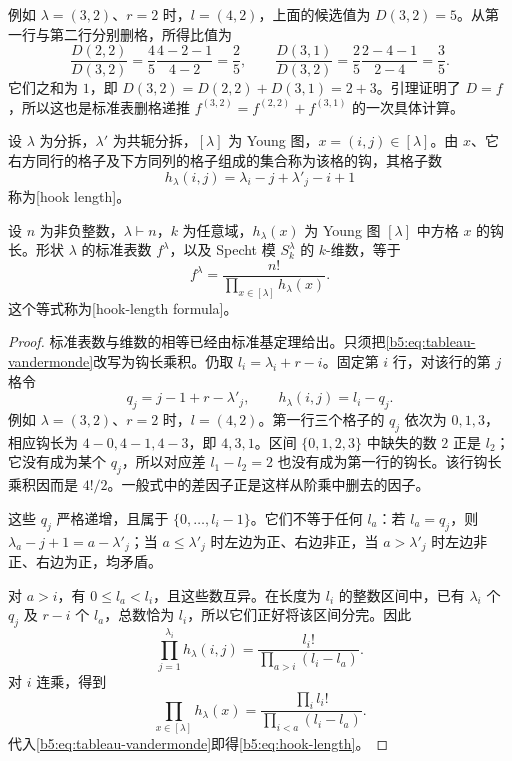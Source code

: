 例如 \(\lambda=(3,2)\)、\(r=2\) 时，\(l=(4,2)\)，上面的候选值为 \(D(3,2)=5\)。从第一行与第二行分别删格，所得比值为
\[
	\frac{D(2,2)}{D(3,2)} =\frac45\frac{4-2-1}{4-2}=\frac25,\qquad \frac{D(3,1)}{D(3,2)} =\frac25\frac{2-4-1}{2-4}=\frac35.
\]
它们之和为 \(1\)，即 \(D(3,2)=D(2,2)+D(3,1)=2+3\)。引理证明了 \(D=f\)，所以这也是标准表删格递推 \(f^{(3,2)}=f^{(2,2)}+f^{(3,1)}\) 的一次具体计算。

\begin{definition}\label{b5:def:hook}
	设 \(\lambda\) 为分拆，\(\lambda'\) 为共轭分拆，\([\lambda]\) 为 Young 图，\(x=(i,j)\in[\lambda]\)。由 \(x\)、它右方同行的格子及下方同列的格子组成的集合称为该格的钩，其格子数
	\[
		h_\lambda(i,j)=\lambda_i-j+\lambda'_j-i+1
	\]
	称为[hook length]。
\end{definition}

\begin{theorem}[钩长公式]\label{b5:thm:hook-length}
	设 \(n\) 为非负整数，\(\lambda\vdash n\)，\(k\) 为任意域，\(h_\lambda(x)\) 为 Young 图 \([\lambda]\) 中方格 \(x\) 的钩长。形状 \(\lambda\) 的标准表数 \(f^\lambda\)，以及 Specht 模 \(S_k^\lambda\) 的 \(k\)-维数，等于
	\begin{equation}\label{b5:eq:hook-length}
		f^\lambda=\frac{n!}{\prod_{x\in[\lambda]}h_\lambda(x)}.
	\end{equation}
	这个等式称为[hook-length formula]。
\end{theorem}
\begin{proof}
	标准表数与维数的相等已经由标准基定理给出。只须把\eqref{b5:eq:tableau-vandermonde}改写为钩长乘积。仍取 \(l_i=\lambda_i+r-i\)。固定第 \(i\) 行，对该行的第 \(j\) 格令
	\[
		q_j=j-1+r-\lambda'_j,\qquad h_\lambda(i,j)=l_i-q_j.
	\]
	例如 \(\lambda=(3,2)\)、\(r=2\) 时，\(l=(4,2)\)。第一行三个格子的 \(q_j\) 依次为 \(0,1,3\)，相应钩长为 \(4-0,4-1,4-3\)，即 \(4,3,1\)。区间 \(\{0,1,2,3\}\) 中缺失的数 \(2\) 正是 \(l_2\)；它没有成为某个 \(q_j\)，所以对应差 \(l_1-l_2=2\) 也没有成为第一行的钩长。该行钩长乘积因而是 \(4!/2\)。一般式中的差因子正是这样从阶乘中删去的因子。

	这些 \(q_j\) 严格递增，且属于 \(\{0,\ldots,l_i-1\}\)。它们不等于任何 \(l_a\)：若 \(l_a=q_j\)，则 \(\lambda_a-j+1=a-\lambda'_j\)；当 \(a\leq\lambda'_j\) 时左边为正、右边非正，当 \(a>\lambda'_j\) 时左边非正、右边为正，均矛盾。

	对 \(a>i\)，有 \(0\leq l_a<l_i\)，且这些数互异。在长度为 \(l_i\) 的整数区间中，已有 \(\lambda_i\) 个 \(q_j\) 及 \(r-i\) 个 \(l_a\)，总数恰为 \(l_i\)，所以它们正好将该区间分完。因此
	\[
		\prod_{j=1}^{\lambda_i}h_\lambda(i,j) =\frac{l_i!}{\prod_{a>i}(l_i-l_a)}.
	\]
	对 \(i\) 连乘，得到
	\[
		\prod_{x\in[\lambda]}h_\lambda(x) =\frac{\prod_i l_i!}{\prod_{i<a}(l_i-l_a)}.
	\]
	代入\eqref{b5:eq:tableau-vandermonde}即得\eqref{b5:eq:hook-length}。
\end{proof}

